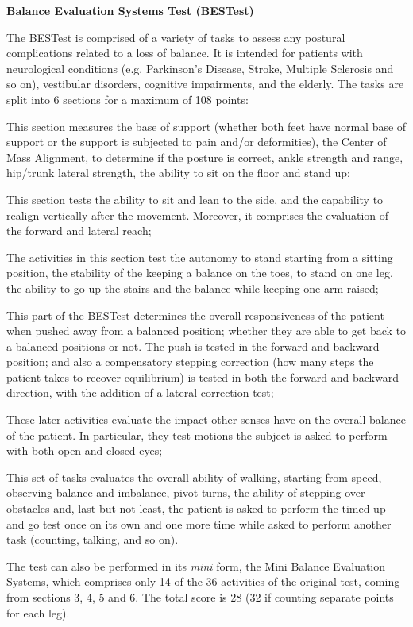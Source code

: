 \vspace{0.3cm}
\textbf{Balance Evaluation Systems Test (BESTest)}

The BESTest is comprised of a variety of tasks to assess any postural complications related to a loss of balance. It is intended for patients with neurological conditions (e.g. Parkinson's Disease, Stroke, Multiple Sclerosis and so on), vestibular disorders,
cognitive impairments, and the elderly. 
The tasks are split into 6 sections for a maximum of 108 points:
\begin{description}
\itemsep0cm 
    \item[\textit{Biomechanical Constraints}] 
    This section measures the base of support (whether both feet have normal base of support or the support is subjected to pain and/or deformities), the Center of Mass Alignment, to determine if the posture is correct, ankle strength and range, hip/trunk lateral strength, the ability to sit on the floor and stand up;
    \item[\textit{Stability limits/verticality}]
    This section tests the ability to sit and lean to the side, and the capability to realign vertically after the movement. Moreover, it comprises the evaluation of the forward and lateral reach;
    \item[\textit{Transitions}]
    The activities in this section test the autonomy to stand starting from a sitting position, the stability of the keeping a balance on the toes, to stand on one leg, the ability to go up the stairs and the balance while keeping one arm raised;
    \item[\textit{Reactivity}]
    This part of the BESTest determines the overall responsiveness of the patient when pushed away from a balanced position; whether they are able to get back to a balanced positions or not. The push is tested in the forward and backward position; and also a compensatory stepping correction (how many steps the patient takes to recover equilibrium) is tested in both the forward and backward direction, with the addition of a lateral correction test;
    \item[\textit{Sensory Orientation}]
    These later activities evaluate the impact other senses have on the overall balance of the patient. In particular, they test motions the subject is asked to perform with both open and closed eyes;
    \item[\textit{Stability of Gait}]
    This set of tasks evaluates the overall ability of walking, starting from speed, observing balance and imbalance, pivot turns, the ability of stepping over obstacles and, last but not least, the patient is asked to perform the timed up and go test once on its own and one more time while asked to perform another task (counting, talking, and so on). 
\end{description}
The test can also be performed in its \textit{mini} form, the Mini Balance Evaluation Systems, 
which comprises only 14 of the 36 activities of the original test, coming from sections 3, 4, 5 and 6. 
The total score is 28 (32 if counting separate points for each leg). 

